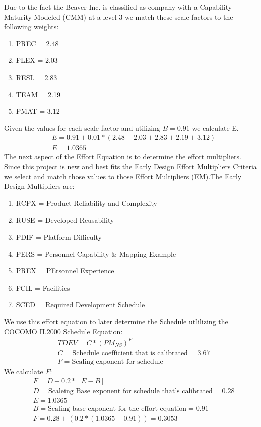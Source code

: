 \documentclass[12pt,letterpaper]{article}
\begin{document}
Due to the fact the Beaver Inc. is classified as company with a Capability Maturity Modeled (CMM) at a level 3 we match these scale factors to the following weights:
    \begin{enumerate}
        \item PREC = 2.48
        \item FLEX = 2.03
        \item RESL = 2.83
        \item TEAM = 2.19
        \item PMAT = 3.12
    \end{enumerate}
Given the values for each scale factor and utilizing $B = 0.91$ we calculate E.
    \begin{align*}
        &E = 0.91 + 0.01 * (2.48+2.03+2.83+2.19+3.12)\\
        &E = 1.0365
    \end{align*}
The next aspect of the Effort Equation is to determine the effort multipliers. Since this project is new and best fits the Early Design Effort Multipliers Criteria we select and match those values to those Effort Multipliers (EM).The Early Design Multipliers are:
    \begin{enumerate}
        \item RCPX = Product Reliability and Complexity
        \item RUSE = Developed Reusability
        \item PDIF = Platform Difficulty
        \item PERS = Personnel Capability & Mapping Example
        \item PREX = PErsonnel Experience
        \item FCIL = Facilities
        \item SCED = Required Development Schedule
    \end{enumerate}
We use this effort equation to later determine the Schedule utlilizing the COCOMO II.2000 Schedule Equation:
    \begin{align*}
        &TDEV = C * (PM_{NS})^F\\
        &C = \text{Schedule coefficient that is calibrated} = 3.67\\
        &F = \text{Scaling exponent for schedule}
    \end{align*}
We calculate $F$:
    \begin{align*}
        &F = D + 0.2*[E-B]\\
        &D = \text{Scaleing Base exponent for schedule that's calibrated}=0.28\\
        &E = 1.0365\\
        &B = \text{Scaling base-exponent for the effort equation} = 0.91\\
        &F= 0.28+(0.2*(1.0365 - 0.91)) = 0.3053
    \end{align*}
\end{document}
